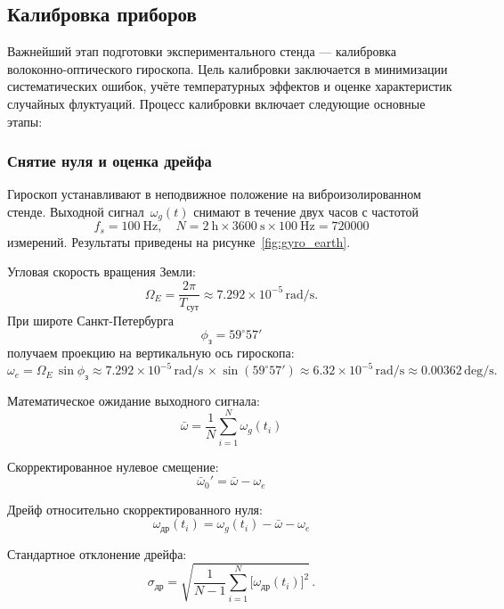 \subsection{Калибровка приборов}

Важнейший этап подготовки экспериментального стенда --- калибровка волоконно-оптического гироскопа. Цель калибровки заключается в минимизации систематических ошибок, учёте температурных эффектов и оценке характеристик случайных флуктуаций. Процесс калибровки включает следующие основные этапы:

\subsubsection{Снятие нуля и оценка дрейфа}

Гироскоп устанавливают в неподвижное положение на виброизолированном стенде. Выходной сигнал~$\omega_g(t)$ снимают в течение двух часов с частотой 
\[
f_s = \SI{100}{\hertz},
\quad
N = 2\ \mathrm{h}\times3600\ \mathrm{s}\times100\ \mathrm{Hz} = 720000
\]
измерений. Результаты приведены на рисунке~\ref{fig:gyro_earth}.

Угловая скорость вращения Земли:
\[
\Omega_E = \frac{2\pi}{T_{\mathrm{сут}}}
\approx 7.292\times10^{-5}\,\mathrm{rad/s}.
\]
При широте Санкт-Петербурга 
\[
\phi_{\mathrm{з}} = 59^\circ57'
\]
получаем проекцию на вертикальную ось гироскопа:
\[
\omega_e
= \Omega_E\,\sin\phi_{\mathrm{з}}
\approx 7.292\times10^{-5}\,\mathrm{rad/s}\,\times\sin(59^\circ57')
\approx 6.32\times10^{-5}\,\mathrm{rad/s}
\approx 0.00362\,\mathrm{deg/s}.
\]

Математическое ожидание выходного сигнала:
\begin{equation}
	\bar{\omega}
	= \frac{1}{N}\sum_{i=1}^{N}\omega_g(t_i)
	\label{eq:mean}
\end{equation}

Скорректированное нулевое смещение:
\begin{equation}
	\bar{\omega}_0'
	= \bar{\omega} - \omega_e
	\label{eq:omega_correct}
\end{equation}

Дрейф относительно скорректированного нуля:
\begin{equation}
	\omega_{\mathrm{др}}(t_i)
	= \omega_g(t_i) - \bar{\omega} - \omega_e
	\label{eq:drift_def}
\end{equation}

Стандартное отклонение дрейфа:
\begin{equation}
	\sigma_{\mathrm{др}}
	= \sqrt{\frac{1}{N-1}\sum_{i=1}^{N}\bigl[\omega_{\mathrm{др}}(t_i)\bigr]^2}\,.
	\label{eq:sigma}
\end{equation}

